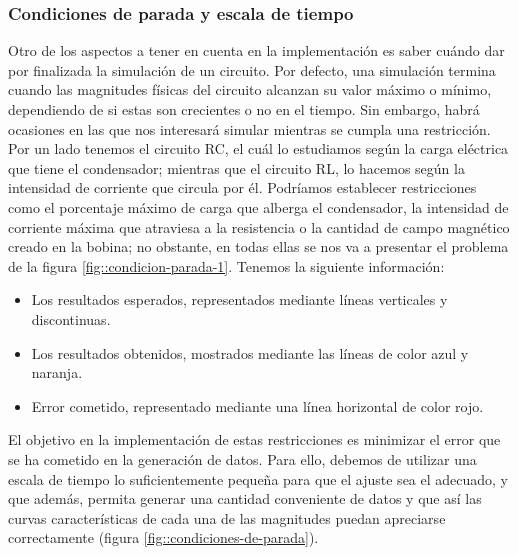 \documentclass[../main.tex]{subfiles}
\begin{document}
\subsubsection{Condiciones de parada y escala de tiempo}
Otro de los aspectos a tener en cuenta en la implementación es saber cuándo dar por finalizada la simulación de un circuito. Por defecto, una simulación termina cuando las magnitudes físicas del circuito alcanzan su valor máximo o mínimo, dependiendo de si estas son crecientes o no en el tiempo. Sin embargo, habrá ocasiones en las que nos interesará simular mientras se cumpla una restricción.\\ 

Por un lado tenemos el circuito RC, el cuál lo estudiamos según la carga eléctrica que tiene el condensador; mientras que el circuito RL, lo hacemos según la intensidad de corriente que circula por él. Podríamos establecer restricciones como el porcentaje máximo de carga que alberga el condensador, la intensidad de corriente máxima que atraviesa a la resistencia o la cantidad de campo magnético creado en la bobina; no obstante, en todas ellas se nos va a presentar el problema de la figura \ref{fig::condicion-parada-1}. Tenemos la siguiente información:

\begin{itemize}
    \item Los resultados esperados, representados mediante líneas verticales y discontinuas. 
    
    \item Los resultados obtenidos, mostrados mediante las líneas de color azul y naranja.
    
    \item Error cometido, representado mediante una línea horizontal de color rojo.
\end{itemize}

El objetivo en la implementación de estas restricciones es minimizar el error que se ha cometido en la generación de datos. Para ello, debemos de utilizar una escala de tiempo lo suficientemente pequeña para que el ajuste sea el adecuado, y que además, permita generar una cantidad conveniente de datos y que así las curvas características de cada una de las magnitudes puedan apreciarse correctamente (figura \ref{fig::condiciones-de-parada}).\\ 
\end{document}
